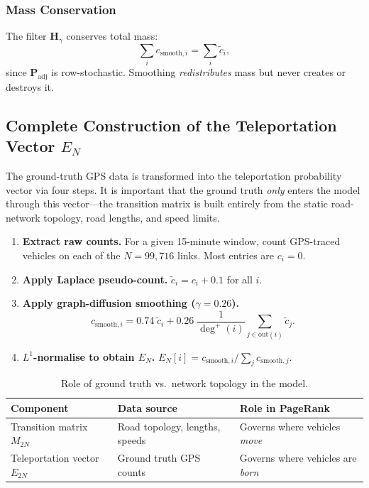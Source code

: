 \documentclass[12pt,a4paper]{article}
\theoremstyle{definition}
\theoremstyle{plain}
\begin{document}
\subsubsection{Mass Conservation}

The filter $\mathbf{H}_\gamma$ conserves total mass:
\[
  \sum_i c_{\text{smooth},i} = \sum_i \tilde{c}_i,
\]
since $\mathbf{P}_{\text{adj}}$ is row-stochastic. Smoothing \emph{redistributes} mass
but never creates or destroys it.

\subsection{Complete Construction of the Teleportation Vector $E_N$}
\label{sec:teleportation_construction}

The ground-truth GPS data is transformed into the teleportation probability vector via
four steps. It is important that the ground truth \emph{only} enters the model through
this vector---the transition matrix is built entirely from the static road-network
topology, road lengths, and speed limits.

\begin{enumerate}[label=\textbf{Step~\arabic*.}]
  \item \textbf{Extract raw counts.}
    For a given 15-minute window, count GPS-traced vehicles on each of the $N = 99{,}716$
    links. Most entries are $c_i = 0$.

  \item \textbf{Apply Laplace pseudo-count.}
    $\tilde{c}_i = c_i + 0.1$ for all $i$.

  \item \textbf{Apply graph-diffusion smoothing ($\gamma = 0.26$).}
    \[
      c_{\text{smooth},i}
      = 0.74\;\tilde{c}_i
      + 0.26\;\frac{1}{\deg^{+}(i)}\sum_{j \in \text{out}(i)} \tilde{c}_j.
    \]

  \item \textbf{$L^1$-normalise to obtain $E_N$.}
    $E_N[i] = c_{\text{smooth},i} / \sum_{j} c_{\text{smooth},j}$.
\end{enumerate}

\begin{table}[H]
  \centering
  \caption{Role of ground truth vs.\ network topology in the model.}
  \label{tab:roles}
  \begin{tabular}{@{}lll@{}}
    \toprule
    Component & Data source & Role in PageRank\\
    \midrule
    Transition matrix $M_{2N}$ & Road topology, lengths, speeds
      & Governs where vehicles \emph{move}\\
    Teleportation vector $E_{2N}$ & Ground truth GPS counts
      & Governs where vehicles are \emph{born}\\
    \bottomrule
  \end{tabular}
\end{table}
\end{document}
